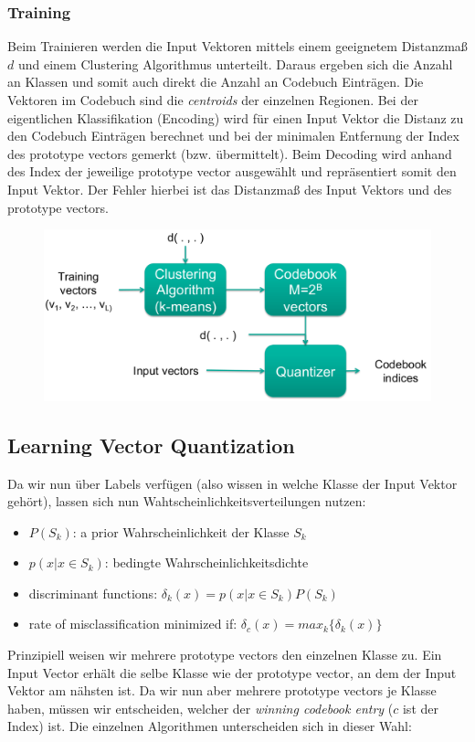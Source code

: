 \subsubsection{Training}
\label{ssect:vq-training}
Beim Trainieren werden die Input Vektoren mittels einem geeignetem Distanzmaß $d$ und einem Clustering Algorithmus unterteilt. Daraus ergeben sich die Anzahl an Klassen und somit auch direkt die Anzahl an Codebuch Einträgen. Die Vektoren im Codebuch sind die \textit{centroids} der einzelnen Regionen.
Bei der eigentlichen Klassifikation (Encoding) wird für einen Input Vektor die Distanz zu den Codebuch Einträgen berechnet und bei der minimalen Entfernung der Index des prototype vectors gemerkt (bzw. übermittelt).
Beim Decoding wird anhand des Index der jeweilige prototype vector ausgewählt und repräsentiert somit den Input Vektor. Der Fehler hierbei ist das Distanzmaß des Input Vektors und des prototype vectors.
\begin{figure}[h]
\includegraphics[scale=0.3]{vector-quantization-training}
\end{figure}

\subsection{Learning Vector Quantization}
\label{ssect:learning-vector-quantization}
Da wir nun über Labels verfügen (also wissen in welche Klasse der Input Vektor gehört), lassen sich nun Wahtscheinlichkeitsverteilungen nutzen:
\begin{itemize}
	\item $P(S_k)$: a prior Wahrscheinlichkeit der Klasse $S_k$
	\item $p(x|x \in S_k) $: bedingte Wahrscheinlichkeitsdichte 
	\item discriminant functions: $\delta_k(x) = p(x|x \in S_k) P(S_k)$
	\item rate of misclassification minimized if: $\delta_c(x) = max_k\{\delta_k(x)\}$
\end{itemize}
Prinzipiell weisen wir mehrere prototype vectors den einzelnen Klasse zu. Ein Input Vector erhält die selbe Klasse wie der prototype vector, an dem der Input Vektor am nähsten ist. Da wir nun aber mehrere prototype vectors je Klasse haben, müssen wir entscheiden, welcher der \textit{winning codebook entry} ($c$ ist der Index) ist. Die einzelnen Algorithmen unterscheiden sich in dieser Wahl:
